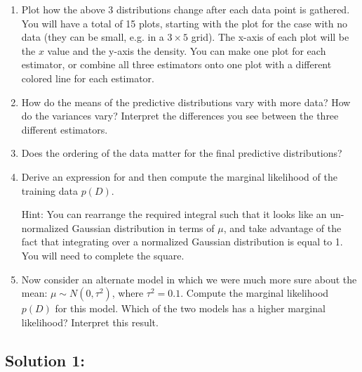 \documentclass[submit]{harvardml}
\begin{document}
\begin{problem}
\begin{enumerate}
   
\item Plot how the above 3 distributions change after each data point
  is gathered.  You will have a total of 15 plots, starting with the
  plot for the case with no data (they can be small, e.g. in a $3\times5$
  grid).  The x-axis of each plot will be the $x$ value and the y-axis
  the density.  You can make one plot for each estimator, or combine
  all three estimators onto one plot with a different colored line for
  each estimator.
  
    
\item How do the means of the predictive distributions vary with more
  data?  How do the variances vary?  Interpret the differences you see
  between the three different estimators.
  
  \item Does the ordering of the data matter for the final predictive
  distributions?  

  \item Derive an expression for and then compute the marginal
    likelihood of the training data $p(D)$.

    Hint: You can rearrange the required integral such that it looks like an un-normalized
    Gaussian distribution in terms of $\mu$,  and take advantage of the fact that
    integrating over a normalized Gaussian distribution is equal to 1.
    You will need to complete the square.
    
  \item Now consider an alternate model in which we were much more sure
  about the mean: $\mu \sim N(0,\tau^2)$, where $\tau^2 = 0.1$.
  Compute the marginal likelihood $p(D)$ for this model.  Which of the
  two models has a higher marginal likelihood? Interpret this result.

\end{enumerate}

\end{problem}

\subsection*{Solution 1:}
\end{document}
